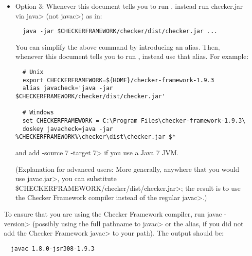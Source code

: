 \begin{itemize}
   \item
   Option 3:
   Whenever this document tells you to run , instead
   run checker.jar via \<java> (not \<javac>) as in:

\begin{Verbatim}
  java -jar $CHECKERFRAMEWORK/checker/dist/checker.jar ...
\end{Verbatim}

    You can simplify the above command by introducing an alias.  Then,
    whenever this document tells you to run , instead use that
    alias.  For example:

\begin{Verbatim}
  # Unix
  export CHECKERFRAMEWORK=${HOME}/checker-framework-1.9.3
  alias javacheck='java -jar $CHECKERFRAMEWORK/checker/dist/checker.jar'

  # Windows
  set CHECKERFRAMEWORK = C:\Program Files\checker-framework-1.9.3\
  doskey javacheck=java -jar %CHECKERFRAMEWORK%\checker\dist\checker.jar $*
\end{Verbatim}

   \noindent
   and add \<-source 7 -target 7> if you use a Java 7 JVM.

   (Explanation for advanced users:  More generally, anywhere that you would use \<javac.jar>, you can substitute
   \<\$CHECKERFRAMEWORK/checker/dist/checker.jar>;
   the result is to use the Checker
   Framework compiler instead of the regular \<javac>.)

\end{itemize}


To ensure that you are using the Checker Framework compiler, run
\<javac -version> (possibly using the
full pathname to \<javac> or the alias, if you did not add the Checker
Framework \<javac> to your path).
The output should be:

\begin{Verbatim}
  javac 1.8.0-jsr308-1.9.3
\end{Verbatim}




